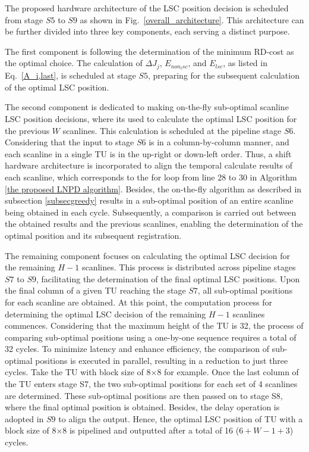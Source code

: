 \documentclass[lettersize,journal]{IEEEtran}
\begin{document}
The proposed hardware architecture of the LSC position decision is scheduled from stage $S5$ to $S9$ as shown in Fig.~\ref{overall_architecture}. This architecture can be further divided into three key components, each serving a distinct purpose.

The first component is following the determination of the minimum RD-cost as the optimal choice. The calculation of $\Delta J_{j}$, $E_{non_lsc}$, and $E_{lsc}$, as listed in Eq.~\eqref{A_i,last}, is scheduled at stage $S5$, preparing for the subsequent calculation of the optimal LSC position.

The second component is dedicated to making on-the-fly sub-optimal scanline LSC position decisions, where its used to calculate the optimal LSC position for the previous $W$ scanlines. This calculation is scheduled at the pipeline stage $S6$. 
Considering that the input to stage $S6$ is in a column-by-column manner, and each scanline in a single TU is in the up-right or down-left order. Thus, a shift hardware architecture is incorporated to align the temporal calculate results of each scanline, which corresponds to the for loop from line 28 to 30 in Algorithm \ref{the proposed LNPD algorithm}. 
Besides, the on-the-fly algorithm as described in subsection \ref{subsecgreedy} results in a sub-optimal position of an entire scanline being obtained in each cycle. Subsequently, a comparison is carried out between the obtained results and the previous scanlines, enabling the determination of the optimal position and its subsequent registration.

The remaining component focuses on calculating the optimal LSC decision for the remaining $H-1$ scanlines. This process is distributed across pipeline stages $S7$ to $S9$, facilitating the determination of the final optimal LSC positions.
Upon the final column of a given TU reaching the stage $S7$, all sub-optimal positions for each scanline are obtained. At this point, the computation process for determining the optimal LSC decision of the remaining $H-1$ scanlines commences.
Considering that the maximum height of the TU is 32, the process of comparing sub-optimal positions using a one-by-one sequence requires a total of 32 cycles. To minimize latency and enhance efficiency, the comparison of sub-optimal positions is executed in parallel, resulting in a reduction to just three cycles.
Take the TU with block size of 8$\times$8 for example. Once the last column of the TU enters stage S7, the two sub-optimal positions for each set of 4 scanlines are determined. These sub-optimal positions are then passed on to stage S8, where the final optimal position is obtained. Besides, the delay operation is adopted in $S9$ to align the output. Hence, the optimal LSC position of TU with a block size of 8$\times$8 is pipelined and outputted after a total of 16 ($6 + W - 1 + 3$) cycles.
\end{document}
